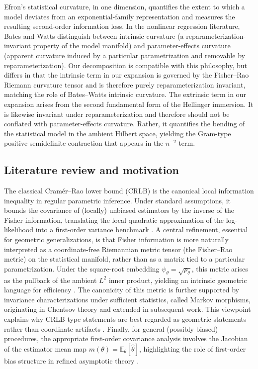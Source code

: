 \documentclass[11pt,letterpaper]{amsart}
\numberwithin{equation}{section}
\theoremstyle{plain}
\theoremstyle{definition}
\theoremstyle{remark}
\begin{document}
Efron's statistical curvature, in one dimension, quantifies the extent to which a model deviates from an exponential-family representation and measures the resulting second-order information loss.
In the nonlinear regression literature, Bates and Watts distinguish between intrinsic curvature (a reparameterization-invariant property of the model manifold) and parameter-effects curvature (apparent curvature induced by a particular parametrization and removable by reparameterization).
Our decomposition is compatible with this philosophy, but differs in that the intrinsic term in our expansion is governed by the Fisher--Rao Riemann curvature tensor and is therefore purely reparameterization invariant, matching the role of Bates--Watts intrinsic curvature.
The extrinsic term in our expansion arises from the second fundamental form of the Hellinger immersion. It is likewise invariant under reparameterization and therefore should not be conflated with parameter-effects curvature.
Rather, it quantifies the bending of the statistical model in the ambient Hilbert space, yielding the Gram-type positive semidefinite contraction that appears in the \(n^{-2}\) term.

\subsection{Literature review and motivation}
The classical Cram\'er--Rao lower bound (CRLB) is the canonical local information inequality in regular parametric inference. Under standard assumptions, it bounds the covariance of (locally) unbiased estimators by the inverse of the Fisher information, translating the local quadratic approximation of the log-likelihood into a first-order variance benchmark \cite{Cramer1999,Kay1993,LehmannCasella1998,Rao1945}. A central refinement, essential for geometric generalizations, is that Fisher information is more naturally interpreted as a coordinate-free Riemannian metric tensor (the Fisher--Rao metric) on the statistical manifold, rather than as a matrix tied to a particular parametrization. Under the square-root embedding \(\psi_\theta=\sqrt{p_\theta}\), this metric arises as the pullback of the ambient \(L^2\) inner product, yielding an intrinsic geometric language for efficiency \cite{Amari2016, AmariNagaoka2000,AyJost2017a,AyJost2017b}. The canonicity of this metric is further supported by invariance characterizations under sufficient statistics, called Markov morphisms, originating in Chentsov theory and extended in subsequent work. This viewpoint explains why CRLB-type statements are best regarded as geometric statements rather than coordinate artifacts \cite{Campbell1986, Chentsov1982}. Finally, for general (possibly biased) procedures, the appropriate first-order covariance analysis involves the Jacobian of the estimator mean map \(m(\theta)=\mathbb{E}_\theta[\hat\theta]\), highlighting the role of first-order bias structure in refined asymptotic theory \cite{BickelKlaassen1993,VanDerVaart2000}.
\end{document}
